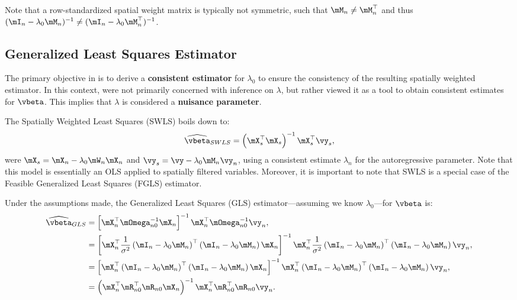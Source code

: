 \documentclass[english,12pt]{book}\usepackage[]{graphicx}\usepackage[]{xcolor}
\begin{document}
Note that a row-standardized spatial weight matrix is typically not symmetric, such that $\mM_n\neq \mM_n^\top$ and thus $(\mI_n - \lambda_0\mM_n)^{-1}\neq (\mI_n - \lambda_0\mM_n^\top)^{-1}$.

\subsection{Generalized Least Squares Estimator}\label{sec:swls}

The primary objective in \cite{kelejian1999generalized} is to derive a \textbf{consistent estimator} for  $\lambda_0$ to ensure the consistency of the resulting spatially weighted estimator. In this context, \cite{kelejian1999generalized} were not primarily concerned with inference on $\lambda$, but rather viewed it as a tool to obtain consistent estimates for $\vbeta$. This implies that $\lambda$ is considered a \textbf{nuisance parameter}. 

The Spatially Weighted Least Squares (SWLS) boils down to:
\begin{equation}\label{eq:beta_swls}
  \widehat{\vbeta}_{SWLS} = \left(\mX_s^\top\mX_s\right)^{-1}\mX_s^\top\vy_s,
\end{equation}
%
were $\mX_s = \mX_n - \lambda_0\mW_n\mX_n$ and $\vy_s = \vy - \lambda_0\mM_n\vy_n$, using a consistent estimate $\widehat{\lambda}_n$ for the autoregressive parameter. Note that this model is essentially an OLS applied to spatially filtered variables. Moreover, it is important to note that SWLS is a special case of the Feasible Generalized Least Squares (FGLS) estimator. 

Under the assumptions made, the Generalized Least Squares (GLS) estimator---assuming we know $\lambda_0$---for $\vbeta$ is:
\begin{equation*}
\begin{aligned}
\widehat{\vbeta}_{GLS}  & = \left[\mX^\top_n\mOmega^{-1}_{n0}\mX_n\right]^{-1}\mX^\top_n\mOmega^{-1}_{n0}\vy_n, \\
& = \left[\mX^\top_n\frac{1}{\sigma^2}\left(\mI_n - \lambda_0\mM_n\right)^\top\left(\mI_n - \lambda_0\mM_n\right)\mX_n\right]^{-1}\mX^\top_n\frac{1}{\sigma^2}\left(\mI_n -\lambda_0\mM_n\right)^\top\left(\mI_n - \lambda_0\mM_n\right)\vy_n,  \\
   & =\left[\mX^\top_n\left(\mI_n - \lambda_0\mM_n\right)^\top\left(\mI_n - \lambda_0\mM_n\right)\mX_n\right]^{-1}\mX^\top_n\left(\mI_n -\lambda_0\mM_n\right)^\top\left(\mI_n - \lambda_0\mM_n\right)\vy_n, \\
  & =\left(\mX_n^\top \mR_{n0}^\top\mR_{n0}\mX_n\right)^{-1} \mX_n^\top \mR_{n0}^\top\mR_{n0}\vy_n. 
\end{aligned}
\end{equation*}
\end{document}
